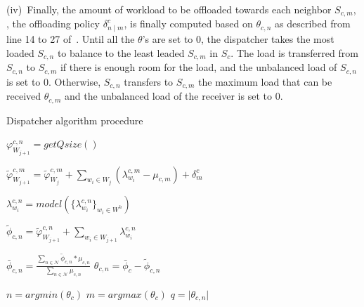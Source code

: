 (iv)~Finally, the amount of workload to be offloaded towards each neighbor $S_{c,m}$, \ie, the offloading policy $\delta^c_{n \mid m}$, is finally computed based on $\theta_{c,n}$ as described from line 14 to 27 of~. Until all the $\theta$'s are set to $0$, the dispatcher takes the most loaded $S_{c,n}$ to balance to the least leaded $S_{c,m}$ in $S_c$. The load is transferred from $S_{c,n}$ to $S_{c,m}$ if there is enough room for the load, and the unbalanced load of $S_{c,n}$ is set to $0$. Otherwise, $S_{c,n}$ transfers to $S_{c,m}$ the maximum load that can be received $\theta_{c,m}$ and the unbalanced load of the receiver is set to $0$.

\begin{algorithm}[t]
\caption{Dispatcher algorithm procedure}
\label{algo:dispatcher}
\SetAlgoLined
{} %
{
\begin{small}
$\varphi^{c,n}_{W_{j+1}} = getQsize()$

{
    $\tilde{\varphi}^{c,m}_{W_{j+1}} = \tilde{\varphi}^{c,m}_{W_{j}} + \sum_{w_i \in W_{j}}(\lambda^{c,m}_{w_i} - \mu_{c,m}) + \delta^c_{m}$\;
}
{
    $\lambda^{c,n}_{w_i} = model(\{\lambda^{c,n}_{w_i}\}_{w_i \in W^h})$\;

    $\tilde{\phi}_{c,n} = \tilde{\varphi}^{c,n}_{W_{j+1}} + \sum_{w_i \in W_{j+1}} \lambda^{c,n}_{w_i}$\;
}


{
    $\bar{\phi}_{c,n} = \frac{\sum_{n \in \mathcal{N}}\tilde{\phi}_{c,n} * \mu_{c,n}}{\sum_{n \in \mathcal{N}} \mu_{c,n}}$\;
    $\theta_{c,n} = \bar{\phi}_{c} - \tilde{\phi}_{c,n}$
}

{
    $n = argmin(\theta_{c})$\;
    $m = argmax(\theta_{c})$\;
    $q = \lvert \theta_{c,n} \lvert$\;
}
\end{small}
    }
\end{algorithm}
